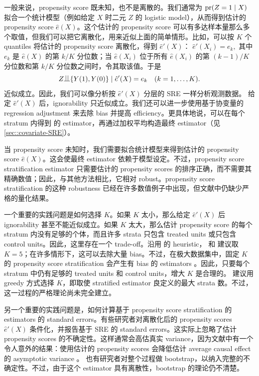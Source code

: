 一般来说，propensity score 既未知，也不是离散的。我们通常为 $\textup{pr}(Z = 1\mid X)$ 拟合一个统计模型（例如给定 $X$ 时二元 $Z$ 的 logistic model），从而得到估计的 propensity score $\hat{e}(X)$。这个估计的 propensity score 可以有多达样本量那么多个取值，但我们可以把它离散化，用来近似上面的简单情形。比如，可以按 $K$ 个 quantiles 将估计的 propensity score 离散化，得到 $\hat{e}'(X)$：
$
\hat{e}'(X_i) = e_k,
$
其中 $e_k$ 是 $\hat{e}(X)$ 的第 $k/K$ 分位数；当 $ \hat{e}(X_i)$ 位于所有 $\hat{e}(X_i)$ 的第 $(k-1)/K$ 分位数和第 $k/K$ 分位数之间时，令其取该值。于是
$$
Z\ind \{ Y(1), Y(0)  \} \mid \hat{e}'(X) = e_k  \quad (k=1,\ldots, K).
$$
近似成立。因此，我们可以像分析按 $\hat{e}'(X)$ 分层的 SRE 一样分析观测数据。
给定 $\hat{e}'(X)$ 后，ignorability 只近似成立。我们还可以进一步使用基于协变量的 regression adjustment 来去除 bias 并提高 efficiency。更具体地说，可以在每个 stratum 内得到 \citet{lin2013} 的 estimator，再通过加权平均构造最终 estimator（见 \cref{sec::covariate-SRE}）。


 




当 propensity score 未知时，我们需要拟合统计模型来得到估计的 propensity score $\hat{e}(X)$。这会使最终 estimator 依赖于模型设定。不过，propensity score stratification estimator 只需要估计的 propensity scores 的排序正确，而不需要其精确数值；因此，与其他方法相比，它相对 robust。propensity score stratification 的这种 robustness 已经在许多数值例子中出现，但文献中仍缺少严格的量化结果。




一个重要的实践问题是如何选择 $K$。如果 $K$ 太小，那么给定 $\hat{e}'(X)$ 后 ignorability 甚至不能近似成立。如果 $K$ 太大，那么估计 propensity score 的每个 stratum 内没有足够的个体，而且许多 strata 只包含 treated units 或只包含 control units。因此，这里存在一个 trade-off。沿用 \citet{cochran1968effectiveness} 的 heuristic，\citet{rosenbaum1983central} 和 \citet{rosenbaum1984reducing} 建议取 $K=5$；在许多情形下，这可以去除大量 bias。不过，在极大数据集中，固定 $K$ 的 propensity score stratification 会产生有 bias 的 estimators \citep{lunceford2004stratification}。因此，只要每个 stratum 中仍有足够的 treated units 和 control units，增大 $K$ 是合理的。\citet{wang2020robust} 建议用 greedy 方式选择 $K$，即取使 stratified estimator 良定义的最大 strata 数。不过，这一过程的严格理论尚未完全建立。




另一个重要的实践问题是，如何计算基于 propensity score stratification 的 estimators 的 standard errors。有些研究者对离散化后的 propensity scores $\hat{e}'(X)$ 条件化，并报告基于 SRE 的 standard errors。这实际上忽略了估计 propensity scores 的不确定性。这样通常会高估真实 variance，因为文献中有一个令人意外的结果：使用估计的 propensity scores 会降低估计 average causal effect 的 asymptotic variance \citep{su2023estimated}。
也有研究者对整个过程做 bootstrap，以纳入完整的不确定性。不过，由于这个 estimator 具有离散性，bootstrap 的理论仍不清楚。
 
